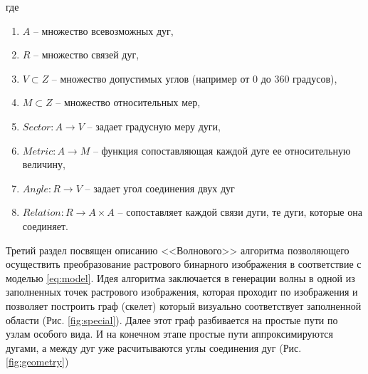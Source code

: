 \noindent
где
\begin{enumerate}
\item[] $A$ -- множество всевозможных дуг,
\item[] $R$ -- множество связей дуг,
\item[] $V \subset Z$ -- множество допустимых углов (например от 0 до 360 градусов),
\item[] $M \subset Z$ -- множество относительных мер,
\item[] $Sector: A \rightarrow V$ -- задает градусную меру дуги,
\item[] $Metric: A \rightarrow M$ -- функция сопоставляющая каждой дуге ее относительную величину,
\item[] $Angle: R \rightarrow V$ -- задает угол соединения двух дуг
\item[] $Relation: R \rightarrow A \times A$ -- сопоставляет каждой связи дуги, те дуги, которые она соединяет.
\end{enumerate}

Третий раздел посвящен описанию <<Волнового>> алгоритма позволяющего осуществить преобразование растрового бинарного изображения в соответствие с моделью \ref{eq:model}. Идея алгоритма заключается в генерации волны в одной из заполненных точек растрового изображения, которая проходит по изображения и позволяет построить граф (скелет) который визуально соответствует заполненной области (Рис. \ref{fig:special}). Далее этот граф разбивается на простые пути по узлам особого вида. И на конечном этапе простые пути аппроксимируются дугами, а между дуг уже расчитываются углы соединения дуг (Рис. \ref{fig:geometry})

